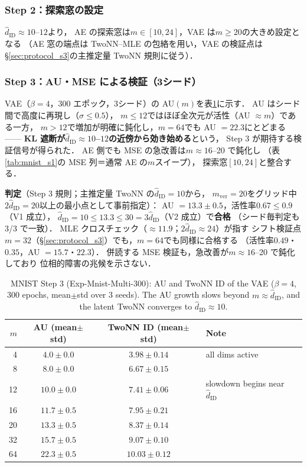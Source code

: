 \documentclass[11pt,a4paper]{jsarticle}
\newcommand{\hatdID}{\hat{d}_{\mathrm{ID}}}
\begin{document}
\subsubsection{Step 2：探索窓の設定}

$\hatdID \approx 10$--$12$より，
AE の探索窓は$m \in [10, 24]$，VAE は$m \geq 20$の大きめ設定となる
（AE 窓の端点は TwoNN--MLE の包絡を用い，VAE の検証点は
§\ref{sec:protocol_s3}の主推定量 TwoNN 規則に従う）．

\subsubsection{Step 3：AU・MSE による検証（3シード）}

VAE（$\beta = 4$，300 エポック，3シード）の AU$(m)$を表\ref{tab:mnist_s3}に示す．
AU はシード間で高度に再現し（$\sigma \leq 0.5$），
$m \leq 12$ではほぼ全次元が活性（AU $\approx m$）である一方，
$m > 12$で増加が明確に鈍化し，$m = 64$でも AU $= 22.3$にとどまる——
\textbf{KL 遮断が$\hatdID \approx 10$--$12$の近傍から効き始める}という，
Step 3 が期待する検証信号が得られた．
AE 側でも MSE の急改善は$m \approx 16$--20 で鈍化し
（表\ref{tab:mnist_s1}の MSE 列＝通常 AE の$m$スイープ），
探索窓$[10, 24]$と整合する．

\textbf{判定}（Step 3 規則；主推定量 TwoNN の$\hatdID = 10$から，
$m_{\mathrm{ver}} = 20$をグリッド中$2\hatdID = 20$以上の最小点として事前指定）：
AU $= 13.3 \pm 0.5$，活性率$0.67 \leq 0.9$（V1 成立），
$\hatdID = 10 \leq 13.3 \leq 30 = 3\hatdID$（V2 成立）で\textbf{合格}
（シード毎判定も 3/3 で一致）．
MLE クロスチェック（$\approx 11.9$；$2\hatdID \approx 24$）が指す
シフト検証点$m = 32$（§\ref{sec:protocol_s3}）でも，$m = 64$でも同様に合格する
（活性率$0.49$・$0.35$，AU $= 15.7$・$22.3$）．
併読する MSE 検証も，急改善が$m \approx 16$--20 で鈍化しており
位相的障害の兆候を示さない．

\begin{table}[H]
\centering
\caption{MNIST Step 3 (Exp-Mnist-Multi-300): AU and TwoNN ID of the VAE
($\beta = 4$, 300 epochs, mean$\pm$std over 3 seeds). The AU growth slows
beyond $m \approx \hatdID$, and the latent TwoNN converges to
$\hatdID \approx 10$.}
\label{tab:mnist_s3}
\small
\begin{tabular}{rccl}
\toprule
$m$ & AU (mean$\pm$std) & TwoNN ID (mean$\pm$std) & Note \\
\midrule
 4 & $4.0 \pm 0.0$ & $3.98 \pm 0.14$ & all dims active \\
 8 & $8.0 \pm 0.0$ & $6.67 \pm 0.15$ & \\
12 & $10.0 \pm 0.0$ & $7.41 \pm 0.06$ & slowdown begins near $\hatdID$ \\
16 & $11.7 \pm 0.5$ & $7.95 \pm 0.21$ & \\
20 & $13.3 \pm 0.5$ & $8.37 \pm 0.14$ & \\
32 & $15.7 \pm 0.5$ & $9.07 \pm 0.10$ & \\
64 & $22.3 \pm 0.5$ & $10.03 \pm 0.12$ & \\
\bottomrule
\end{tabular}
\end{table}
\end{document}
